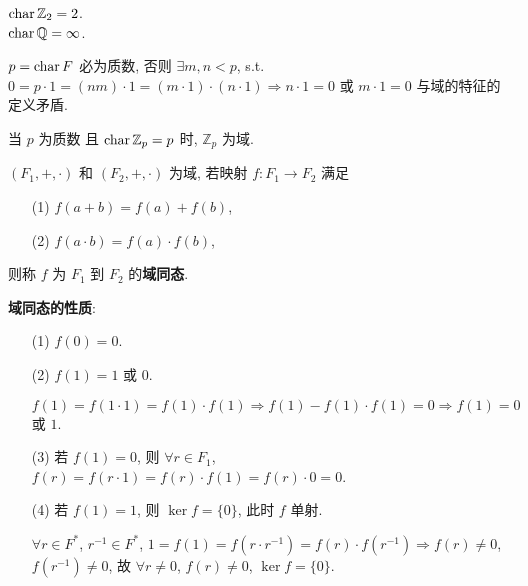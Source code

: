 \documentclass{note}
\begin{document}
\begin{eg}
    $\operatorname{char}\mathbb{Z}_2=2$.\\
    $\operatorname{char}\mathbb{Q}=\infty$.
\end{eg}

$p=\operatorname{char} F$ 必为质数, 否则 $\exists m,n<p$, s.t. $0=p\cdot 1=(nm)\cdot 1=(m\cdot 1)\cdot(n\cdot 1)\Longrightarrow n\cdot 1=0$ 或 $m\cdot 1=0$ 与域的特征的定义矛盾.

当 $p$ 为质数 且 $\operatorname{char}\mathbb{Z}_p=p$ 时, $\mathbb{Z}_p$ 为域.

\begin{df}[域同态]
    $(F_1,+,\cdot)$ 和 $(F_2,+,\cdot)$ 为域, 若映射 $f:F_1\rightarrow F_2$ 满足
    \begin{itemize}
        \item[(1)] $f(a+b)=f(a)+f(b)$,
        \item[(2)] $f(a\cdot b)=f(a)\cdot f(b)$,
    \end{itemize}
    则称 $f$ 为 $F_1$ 到 $F_2$ 的\textbf{域同态}.
\end{df}

\textbf{域同态的性质}:
\begin{itemize}
    \item[(1)] $f(0)=0$.
    \item[(2)] $f(1)=1$ 或 $0$.
    \begin{pf}
        $f(1)=f(1\cdot 1)=f(1)\cdot f(1)\Longrightarrow f(1)-f(1)\cdot f(1)=0\Longrightarrow f(1)=0$ 或 $1$.
    \end{pf}
    \item[(3)] 若 $f(1)=0$, 则 $\forall r\in F_1$, $f(r)=f(r\cdot 1)=f(r)\cdot f(1)=f(r)\cdot 0=0$.
    \item[(4)] 若 $f(1)=1$, 则 $\ker f=\{0\}$, 此时 $f$ 单射.
    \begin{pf}
        $\forall r\in F^*$, $r^{-1}\in F^*$, $1=f(1)=f(r\cdot r^{-1})=f(r)\cdot f(r^{-1})\Longrightarrow f(r)\neq 0$, $f(r^{-1})\neq 0$, 故 $\forall r\neq 0$, $f(r)\neq 0$, $\ker f=\{0\}$.
    \end{pf}
\end{itemize}
\ifx\allfiles\undefined
\end{document}
